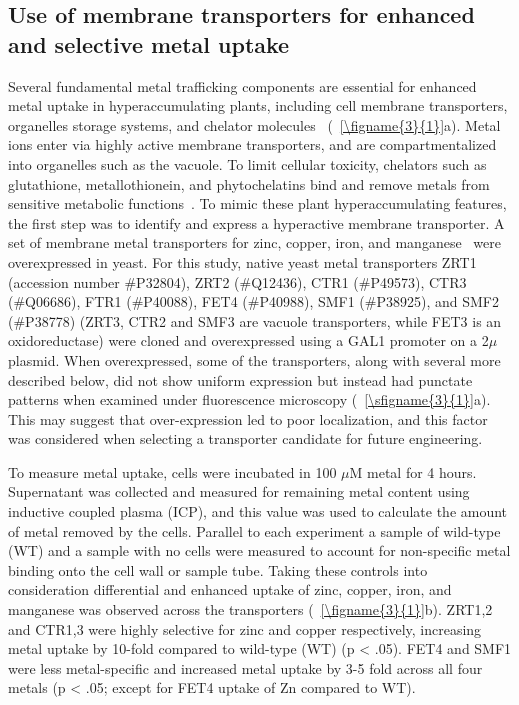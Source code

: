 \documentclass[../main/main]{subfiles}
\begin{document}
\subsection{Use of membrane transporters for enhanced and selective metal uptake}
Several fundamental metal trafficking components are essential for enhanced metal uptake in hyperaccumulating plants, including cell membrane transporters, organelles storage systems, and chelator molecules~\cite{clemens2002,hall2002} (\FIGURE~\ref{\figname{3}{1}}a). Metal ions enter via highly active membrane transporters, and are compartmentalized into organelles such as the vacuole. To limit cellular toxicity, chelators such as glutathione, metallothionein, and phytochelatins bind and remove metals from sensitive metabolic functions~\cite{hall2002}. To mimic these plant hyperaccumulating features, the first step was to identify and express a hyperactive membrane transporter.
A set of membrane metal transporters for zinc, copper, iron, and manganese~\cite{kramer2010metal,clemens2002,andre1995,luk2003,anthonyvanho2002} were overexpressed in yeast. For this study, native yeast metal transporters ZRT1 (accession number \#{}P32804),
ZRT2 (\#{}Q12436),
CTR1 (\#{}P49573),
CTR3 (\#{}Q06686),
FTR1 (\#{}P40088),
FET4 (\#{}P40988),
SMF1 (\#{}P38925),
and SMF2 (\#{}P38778) (ZRT3, CTR2 and SMF3 are vacuole transporters, while FET3 is an oxidoreductase) were cloned and overexpressed using a GAL1 promoter on a 2$\mu$ plasmid. When overexpressed, some of the transporters, along with several more described below, did not show uniform expression but instead had punctate patterns when examined under fluorescence microscopy (\sFIGURE~\ref{\sfigname{3}{1}}a). This may suggest that over-expression led to poor localization, and this factor was considered when selecting a transporter candidate for future engineering.

To measure metal uptake, cells were incubated in 100 $\mu$M metal for 4 hours. Supernatant was collected and measured for remaining metal content using inductive coupled plasma (ICP), and this value was used to calculate the amount of metal removed by the cells. Parallel to each experiment a sample of wild-type (WT) and a sample with no cells were measured to account for non-specific metal binding onto the cell wall or sample tube. Taking these controls into consideration differential and enhanced uptake of zinc, copper, iron, and manganese was observed across the transporters (\FIGURE~\ref{\figname{3}{1}}b). ZRT1,2 and CTR1,3 were highly selective for zinc and copper respectively, increasing metal uptake by 10-fold compared to wild-type (WT) (p < .05). FET4 and SMF1 were less metal-specific and increased metal uptake by 3-5 fold across all four metals (p < .05; except for FET4 uptake of Zn compared to WT).
\end{document}
